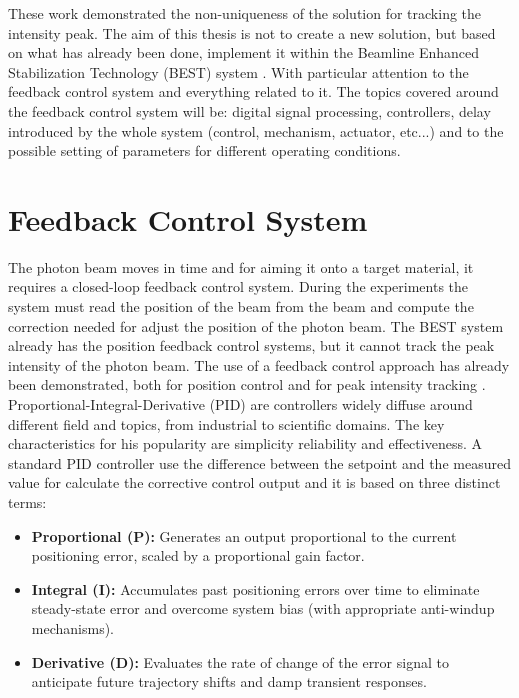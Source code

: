 These work demonstrated the non-uniqueness of the solution for tracking the intensity peak.
The aim of this thesis is not to create a new solution, but based on what has already been done, implement it within the Beamline Enhanced Stabilization Technology (BEST) system \cite{BEST2024}.
With particular attention to the feedback control system and everything related to it.
The topics covered around the feedback control system will be: digital signal processing, controllers, delay introduced by the whole system (control, mechanism, actuator, etc...) and to the possible setting of parameters for different operating conditions.

\section{Feedback Control System}

The photon beam moves in time and for aiming it onto a target material, it requires a closed-loop feedback control system.
During the experiments the system must read the position of the beam from the beam and compute the correction needed for adjust the position of the photon beam.
The BEST system already has the position feedback control systems, but it cannot track the peak intensity of the photon beam.
The use of a feedback control approach has already been demonstrated, both for position control and for peak intensity tracking  \cite{Proux2006,MoCo2008,vanSilfhout2014,Quinn2021}.
Proportional-Integral-Derivative (PID) are controllers widely diffuse around different field and topics, from industrial to scientific domains. 
The key characteristics for his popularity are simplicity reliability and effectiveness.
A standard PID controller use the difference between the setpoint and the measured value for calculate the corrective control output and it is based on three distinct terms:

\begin{itemize}
    \item \textbf{Proportional (P):} Generates an output proportional to the current positioning error, scaled by a proportional gain factor.
    \item \textbf{Integral (I):} Accumulates past positioning errors over time to eliminate steady-state error and overcome system bias (with appropriate anti-windup mechanisms).
    \item \textbf{Derivative (D):} Evaluates the rate of change of the error signal to anticipate future trajectory shifts and damp transient responses.
\end{itemize}

